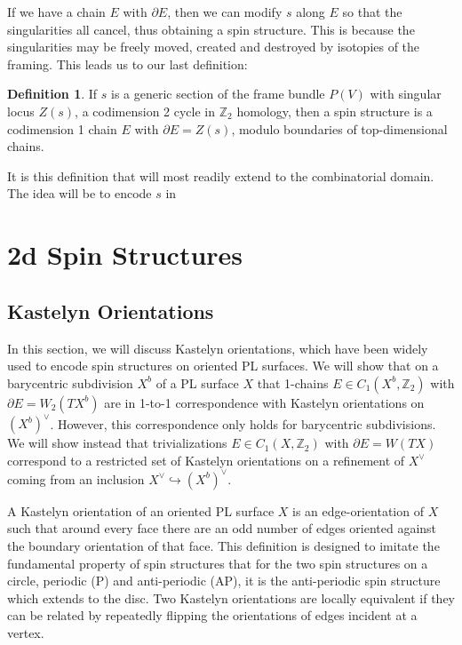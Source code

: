 \documentclass{article}
\def\bZ{\mathbb{Z}}
\theoremstyle{definition}
\newtheorem{defn}{Definition}
\begin{document}
If we have a chain $E$ with $\partial E$, then we can modify $s$ along $E$ so that the singularities all cancel, thus obtaining a spin structure. This is because the singularities may be freely moved, created and destroyed by isotopies of the framing. This leads us to our last definition:

\begin{defn}
If $s$ is a generic section of the frame bundle $P(V)$ with singular locus $Z(s)$, a codimension 2 cycle in $\bZ_2$ homology, then a spin structure is a codimension 1 chain $E$ with $\partial E = Z(s)$, modulo boundaries of top-dimensional chains.
\end{defn}
It is this definition that will most readily extend to the combinatorial domain. The idea will be to encode $s$ in 

\section{2d Spin Structures}

\subsection{Kastelyn Orientations}

In this section, we will discuss Kastelyn orientations, which have been widely used to encode spin structures on oriented PL surfaces. We will show that on a barycentric subdivision $X^b$ of a PL surface $X$ that 1-chains $E \in C_1(X^b,\bZ_2)$ with $\partial E = W_2(TX^b)$ are in 1-to-1 correspondence with Kastelyn orientations on $(X^b)^\vee$. However, this correspondence only holds for barycentric subdivisions. We will show instead that trivializations $E \in C_1(X,\bZ_2)$ with $\partial E = W(TX)$ correspond to a restricted set of Kastelyn orientations on a refinement of $X^\vee$ coming from an inclusion $X^\vee \hookrightarrow (X^b)^\vee$.


A Kastelyn orientation \cite{KASTELEYN19611209,temperlyfisher,Cimasoni2007,baxter2013exactly} of an oriented PL surface $X$ is an edge-orientation of $X$ such that around every face there are an odd number of edges oriented against the boundary orientation of that face. This definition is designed to imitate the fundamental property of spin structures that for the two spin structures on a circle, periodic (P) and anti-periodic (AP), it is the anti-periodic spin structure which extends to the disc. Two Kastelyn orientations are locally equivalent if they can be related by repeatedly flipping the orientations of edges incident at a vertex.
\end{document}
